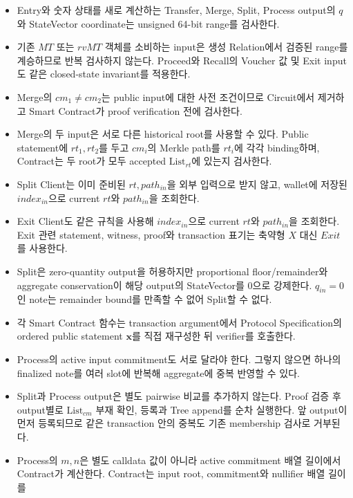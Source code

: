 \documentclass[11pt]{extarticle}
\newcommand{\List}[1]{\mathrm{List}_{#1}}
\begin{document}
\begin{itemize}
  \item Entry와 숫자 상태를 새로 계산하는 Transfer, Merge, Split, Process output의
        $q$와 StateVector coordinate는 unsigned 64-bit range를 검사한다.
  \item 기존 $MT$ 또는 $rvMT$ 객체를 소비하는 input은 생성 Relation에서 검증된 range를
        계승하므로 반복 검사하지 않는다. Proceed와 Recall의 Voucher 값 및 Exit input도
        같은 closed-state invariant를 적용한다.
  \item Merge의 $cm_1\neq cm_2$는 public input에 대한 사전 조건이므로 Circuit에서 제거하고
        Smart Contract가 proof verification 전에 검사한다.
  \item Merge의 두 input은 서로 다른 historical root를 사용할 수 있다. Public statement에
        $rt_1,rt_2$를 두고 $cm_i$의 Merkle path를 $rt_i$에 각각 binding하며, Contract는
        두 root가 모두 accepted $\List{rt}$에 있는지 검사한다.
  \item Split Client는 이미 준비된 $rt,path_{in}$을 외부 입력으로 받지 않고, wallet에
        저장된 $index_{in}$으로 current $rt$와 $path_{in}$을 조회한다.
  \item Exit Client도 같은 규칙을 사용해 $index_{in}$으로 current $rt$와
        $path_{in}$을 조회한다. Exit 관련 statement, witness, proof와 transaction 표기는
        축약형 $X$ 대신 $Exit$를 사용한다.
  \item Split은 zero-quantity output을 허용하지만 proportional floor/remainder와 aggregate
        conservation이 해당 output의 StateVector를 0으로 강제한다. $q_{in}=0$인 note는
        remainder bound를 만족할 수 없어 Split할 수 없다.
  \item 각 Smart Contract 함수는 transaction argument에서 Protocol Specification의
        ordered public statement $\mathbf{x}$를 직접 재구성한 뒤 verifier를 호출한다.
  \item Process의 active input commitment도 서로 달라야 한다. 그렇지 않으면 하나의
        finalized note를 여러 slot에 반복해 aggregate에 중복 반영할 수 있다.
  \item Split과 Process output은 별도 pairwise 비교를 추가하지 않는다. Proof 검증 후
        output별로 $\List{cm}$ 부재 확인, 등록과 Tree append를 순차 실행한다. 앞 output이
        먼저 등록되므로 같은 transaction 안의 중복도 기존 membership 검사로 거부된다.
  \item Process의 $m,n$은 별도 calldata 값이 아니라 active commitment 배열 길이에서
        Contract가 계산한다. Contract는 input root, commitment와 nullifier 배열 길이를

\end{itemize}
\end{document}
